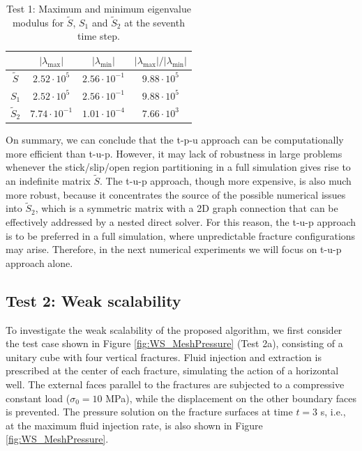 \documentclass[3p,times]{elsarticle}
\theoremstyle{plain}
\newcommand{\tS}{\widetilde{S}}
\begin{document}
\begin{table}%
  \centering
  \begin{tabular}{c|cc|c}
   & $|\lambda_{\max}|$ & $|\lambda_{\min}|$ & $|\lambda_{\max}|/|\lambda_{\min}|$ \\
  \hline
   $\tS$   & $2.52 \cdot 10^5$    & $2.56 \cdot 10^{-1}$ & $9.88 \cdot 10^5$ \\
   $S_1$   & $2.52 \cdot 10^5$    & $2.56 \cdot 10^{-1}$ & $9.88 \cdot 10^5$ \\
   $\tS_2$ & $7.74 \cdot 10^{-1}$ & $1.01 \cdot 10^{-4}$ & $7.66 \cdot 10^3$ \\
  \end{tabular}
  \caption{Test 1: Maximum and minimum eigenvalue modulus for $\tS$, $S_1$ and $\tS_2$ at the seventh time step.}
  \label{tab:EI_eig}
\end{table}


On summary, we can conclude that the t-p-u approach can be computationally more efficient than t-u-p. However, it may lack of robustness in large problems whenever the stick/slip/open region partitioning in a full simulation gives rise to an indefinite matrix $\tS$. The t-u-p approach, though more expensive, is also much more robust, because it concentrates the source of the possible numerical issues into $\tS_2$, which is a symmetric matrix with a 2D graph connection that can be effectively addressed by a nested direct solver. For this reason, the t-u-p approach is to be preferred in a full simulation, where unpredictable fracture configurations may arise. Therefore, in the next numerical experiments we will focus on t-u-p approach alone.

\subsection{Test 2: Weak scalability}

To investigate the weak scalability of the proposed algorithm, we first consider the test case shown in Figure
\ref{fig:WS_MeshPressure} (Test 2a), consisting of a unitary cube with four vertical fractures. Fluid injection and extraction is prescribed at the center of each fracture, simulating the action of a horizontal well.
The external faces parallel to the fractures are subjected to a
compressive constant load ($\sigma_0 = 10$ MPa), while the displacement on the other boundary faces is prevented. 
The pressure solution on the fracture surfaces at time $t=3$ s, i.e., at the maximum fluid injection rate, is also shown in Figure \ref{fig:WS_MeshPressure}.
\end{document}
